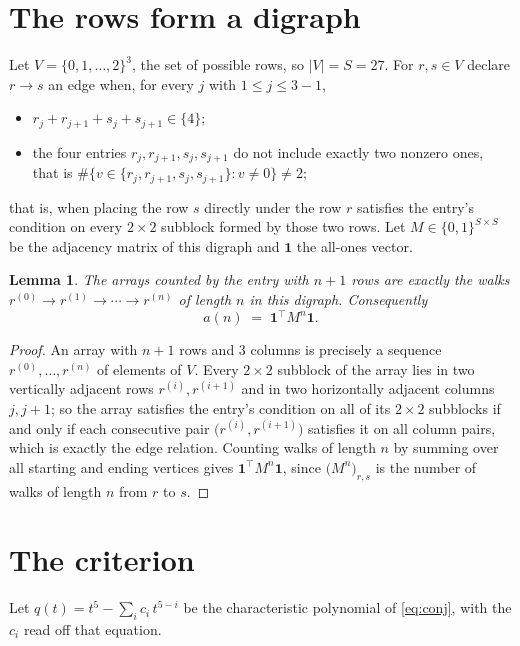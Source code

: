 \documentclass[11pt,a4paper]{article}
\theoremstyle{plain}
\newtheorem{lemma}[theorem]{Lemma}
\theoremstyle{definition}
\begin{document}
\section{The rows form a digraph}

Let $V=\{0,1,\dots,2\}^{3}$, the set of possible rows, so $|V|=S=27$. For
$r,s\in V$ declare $r\to s$ an edge when, for every $j$ with $1\le j\le 3-1$,
\begin{itemize}
\item $r_j+r_{j+1}+s_j+s_{j+1}\in\{4\}$;
\item the four entries $r_j,r_{j+1},s_j,s_{j+1}$ do not include exactly two nonzero ones, that is $\#\bigl\{v\in\{r_j,r_{j+1},s_j,s_{j+1}\}: v\ne0\bigr\}\ne2$;
\end{itemize}
that is, when placing the row $s$ directly under the row $r$ satisfies the entry's
condition on every $2\times2$ subblock formed by those two rows. Let $M\in\{0,1\}^{S\times
S}$ be the adjacency matrix of this digraph and $\mathbf{1}$ the all-ones vector.

\begin{lemma}\label{lem:walk}
The arrays counted by the entry with $n+1$ rows are exactly the walks
$r^{(0)}\to r^{(1)}\to\cdots\to r^{(n)}$ of length $n$ in this digraph. Consequently
\[
a(n)\;=\;\mathbf{1}^{\!\top}M^{n}\mathbf{1} .
\]
\end{lemma}

\begin{proof}
An array with $n+1$ rows and $3$ columns is precisely a sequence
$r^{(0)},\dots,r^{(n)}$ of elements of $V$. Every $2\times2$ subblock of the array lies
in two vertically adjacent rows $r^{(i)},r^{(i+1)}$ and in two horizontally adjacent
columns $j,j+1$; so the array satisfies the entry's condition on all of its $2\times2$
subblocks if and only if each consecutive pair $\bigl(r^{(i)},r^{(i+1)}\bigr)$ satisfies
it on all column pairs, which is exactly the edge relation. Counting walks of length $n$ by
summing over all starting and ending vertices gives
$\mathbf{1}^{\!\top}M^{n}\mathbf{1}$, since
$\bigl(M^{n}\bigr)_{r,s}$ is the number of walks of length $n$ from $r$ to $s$.
\end{proof}

\section{The criterion}

Let $q(t)=t^{5}-\sum_{i}c_i\,t^{5-i}$ be the characteristic polynomial of
\eqref{eq:conj}, with the $c_i$ read off that equation.
\end{document}
